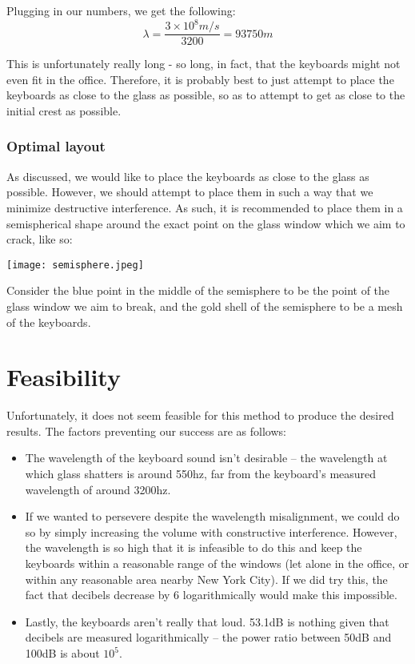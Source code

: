 \documentclass{article}
\begin{document}
\begin{multicols}{2}
Plugging in our numbers, we get the following:
$$\lambda = \frac{3\times 10^{8} m/s}{3200} = 93750m$$

This is unfortunately really long - so long, in fact, that the keyboards might not even fit in the office. Therefore, it is probably best to just attempt to place the keyboards as close to the glass as possible, so as to attempt to get as close to the initial crest as possible. 

\subsubsection{Optimal layout}

As discussed, we would like to place the keyboards as close to the glass as possible. However, we should attempt to place them in such a way that we minimize destructive interference. As such, it is recommended to place them in a semispherical shape around the exact point on the glass window which we aim to crack, like so:

\begin{center}
\texttt{[image: semisphere.jpeg]} \end{center} \begin{center}\small Consider the blue point in the middle of the semisphere to be the point of the glass window we aim to break, and the gold shell of the semisphere to be a mesh of the keyboards. \end{center}

\section{Feasibility}

Unfortunately, it does not seem feasible for this method to produce the desired results. The factors preventing our success are as follows:

\begin{itemize}
    \item The wavelength of the keyboard sound isn't desirable -- the wavelength at which glass shatters is around 550hz, far from the keyboard's measured wavelength of around 3200hz. 
    \item If we wanted to persevere despite the wavelength misalignment, we could do so by simply increasing the volume with constructive interference. However, the wavelength is so high that it is infeasible to do this and keep the keyboards within a reasonable range of the windows (let alone in the office, or within any reasonable area nearby New York City). If we did try this, the fact that decibels decrease by 6 logarithmically would make this impossible.
    \item Lastly, the keyboards aren't really that loud. 53.1dB is nothing given that decibels are measured logarithmically -- the power ratio between 50dB and 100dB is about $10^5$.
\end{itemize}


\end{multicols}
\end{document}

